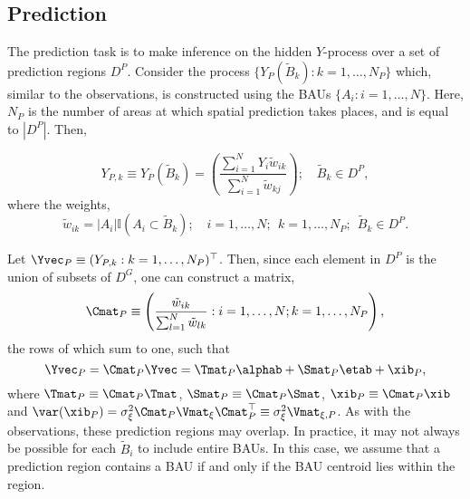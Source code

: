 
\subsection{Prediction} \label{sec:prediction}

The prediction task is to make inference on the hidden $Y$-process over a set of prediction regions $D^P$. Consider the process $\{Y_P(\tilde{B}_k): k = 1,\dots,N_P\}$ which, similar to the observations, is constructed using the BAUs $\{A_i: i = 1,\dots,N\}$. Here, $N_P$ is the number of areas at which spatial prediction takes places, and is equal to $|D^P|$. Then,

\begin{equation*}
Y_{P,k} \equiv Y_{P}(\tilde{B}_k) = \left(\frac{\sum_{i =1}^N Y_i \tilde w_{ik}}{\sum_{i=1}^N \tilde w_{kj}}\right); \quad \tilde{B}_k \in D^P,
\end{equation*}
where the weights,
$$ \tilde w_{ik} = |A_i|\mathbb{I}(A_i \subset \tilde{B}_k); \quad i = 1,\dots,N;~~k = 1,\dots, N_P; ~~\tilde{B}_k \in D^P.$$

Let $\Yvec_P \equiv (Y_{P,k} : k = 1,\dots,N_P)^\top$. Then, since each element in $D^P$ is the union of subsets of $D^G$, one can construct a matrix,
\begin{equation}\label{eq:CP}
\Cmat_P \equiv \left(\frac{\tilde w_{ik}}{\sum_{l=1}^N \tilde w_{lk}} : i = 1,\dots,N; k = 1,\dots,N_P\right),
\end{equation}
the rows of which sum to one, such that
\begin{equation*}
\Yvec_P = \Cmat_P\Yvec = \Tmat_P\alphab + \Smat_P\etab + \xib_P,
\end{equation*}
where $\Tmat_P \equiv \Cmat_P \Tmat$, $\Smat_P \equiv \Cmat_P \Smat$, $\xib_P \equiv \Cmat_P \xib$ and $\var(\xib_P) = \sigma^2_\xi\Cmat_P\Vmat_\xi\Cmat_P^\top \equiv \sigma^2_\xi\Vmat_{\xi,P}$.  As with the observations, these prediction regions may overlap. In practice, it may not always be possible for each $\tilde{B}_i$ to include entire BAUs. In this case, we assume that a prediction region contains a BAU if and only if the BAU centroid lies within the region.

